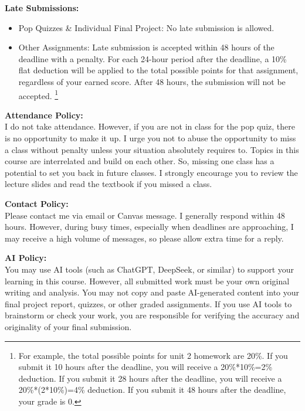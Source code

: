 \documentclass[11pt]{article}
\begin{document}
\vspace{0.5cm}
\large \textbf{Late Submissions:}
\begin{itemize}
    \item Pop Quizzes \& Individual Final Project: No late submission is allowed.
    \item Other Assignments: Late submission is accepted within 48 hours of the deadline with a penalty. For each 24-hour period after the deadline, a 10\% flat deduction will be applied to the total possible points for that assignment, regardless of your earned score. After 48 hours, the submission will not be accepted. \footnote{For example, the total possible points for unit 2 homework are 20\%. If you submit it 10 hours after the deadline, you will receive a 20\%*10\%=2\% deduction. If you submit it 28 hours after the deadline, you will receive a 20\%*(2*10\%)=4\% deduction. If you submit it 48 hours after the deadline, your grade is 0.}
\end{itemize}



\vspace{0.5cm}
\large \textbf{Attendance Policy:}\\[0.5em]
I do not take attendance. However, if you are not in class for the pop quiz, there is no opportunity to make it up. I urge you not to abuse the opportunity to miss a class without penalty unless your situation absolutely requires to. Topics in this course are interrelated and build on each other. So, missing one class has a potential to set you back in future classes. I strongly encourage you to review the lecture slides and read the textbook if you missed a class.


\vspace{0.5cm}
\large \textbf{Contact Policy:}\\[0.5em]
Please contact me via email or Canvas message. I generally respond within 48 hours. However, during busy times, especially when deadlines are approaching, I may receive a high volume of messages, so please allow extra time for a reply.

\vspace{0.5cm}
\large \textbf{AI Policy:}\\[0.5em]
You may use AI tools (such as ChatGPT, DeepSeek, or similar) to support your learning in this course. However, all submitted work must be your own original writing and analysis. You may not copy and paste AI-generated content into your final project report, quizzes, or other graded assignments. If you use AI tools to brainstorm or check your work, you are responsible for verifying the accuracy and originality of your final submission.
\end{document}
